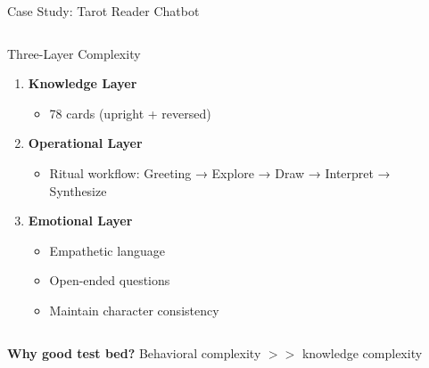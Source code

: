 \documentclass[aspectratio=169]{beamer}
\begin{document}
\begin{frame}{Case Study: Tarot Reader Chatbot}
\begin{columns}[T]
\begin{block}{Three-Layer Complexity}
\begin{enumerate}
    \item \textbf{Knowledge Layer}
    \begin{itemize}
        \item 78 cards (upright + reversed)
    \end{itemize}
    
    \item \textbf{Operational Layer}
    \begin{itemize}
        \item Ritual workflow: Greeting → Explore → Draw → Interpret → Synthesize
    \end{itemize}
    
    \item \textbf{Emotional Layer}
    \begin{itemize}
        \item Empathetic language
        \item Open-ended questions
        \item Maintain character consistency
    \end{itemize}
\end{enumerate}
\end{block}

\begin{center}
\end{center}
\end{columns}

\vspace{0.3cm}
\textbf{Why good test bed?} Behavioral complexity $>>$ knowledge complexity
\end{frame}
\end{document}
